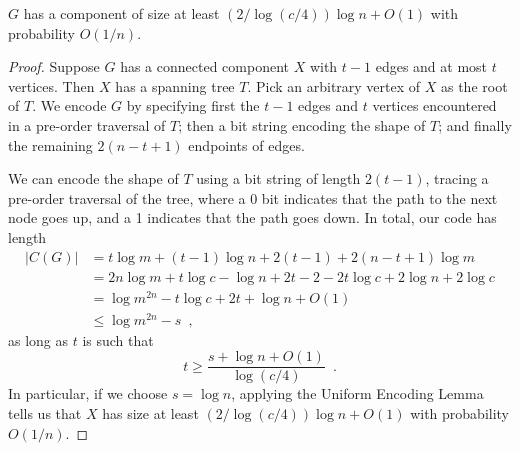 \documentclass{patmorin}
\begin{document}
\begin{lem}
  $G$ has a component of size at least $(2/\log(c/4))\log n + O(1)$
  with probability $O(1/n)$.
\end{lem}
\begin{proof}
  Suppose $G$ has a connected component $X$ with $t - 1$ edges and at
  most $t$ vertices. Then $X$ has a spanning tree $T$. Pick an
  arbitrary vertex of $X$ as the root of $T$. We encode $G$ by
  specifying first the $t - 1$ edges and $t$ vertices encountered in a
  pre-order traversal of $T$; then a bit string encoding the shape of
  $T$; and finally the remaining $2(n - t + 1)$ endpoints of edges.

  We can encode the shape of $T$ using a bit string of length
  $2(t - 1)$, tracing a pre-order traversal of the tree, where a 0 bit
  indicates that the path to the next node goes up, and a 1 indicates
  that the path goes down. In total, our code has length
  \begin{align*}
    |C(G)| &= t \log m + (t - 1) \log n + 2(t - 1) + 2 (n - t + 1) \log m \\
           &= 2n\log m + t \log c - \log n + 2t - 2 - 2t \log c + 2\log n + 2 \log c \tag{since $m = cn$}\\
           &= \log m^{2n} - t \log c + 2t + \log n + O(1) \\
           &\le \log m^{2n} - s \enspace ,
  \end{align*}
  as long as $t$ is such that
  \[
    t \geq \frac{s + \log n + O(1)}{\log (c/4)} \enspace .
  \]
  In particular, if we choose $s = \log n$, applying the Uniform
  Encoding Lemma tells us that $X$ has size at least $(2/\log
  (c/4))\log n + O(1)$ with probability $O(1/n)$.
\end{proof}
\end{document}
